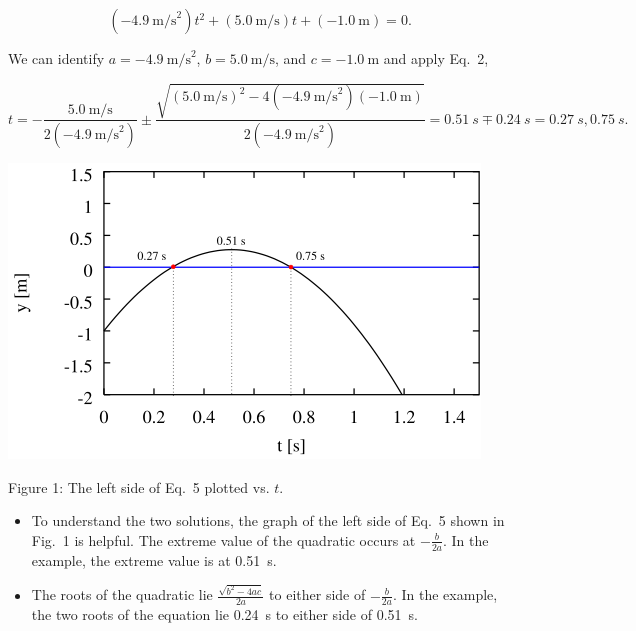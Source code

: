 \documentclass[12pt]{article}
\begin{document}
\begin{itemize}
  \begin{equation}
    \label{eq:example}
    (-4.9~\mathrm{m/s}^2) t^2 + (5.0~\mathrm{m/s}) t + (-1.0~\mathrm{m}) = 0.
  \end{equation}

  \noindent
  We can identify $a =-4.9~\mathrm{m/s}^2$, $b = 5.0~\mathrm{m/s}$, and
  $c = -1.0~\mathrm{m}$ and apply Eq.~2,%

  \begin{equation}
    t = -\frac{5.0~\mathrm{m/s}}{2(-4.9~\mathrm{m/s}^2)} 
    \pm \frac{\sqrt{(5.0~\mathrm{m/s})^2 - 
        4(-4.9~\mathrm{m/s}^2)(-1.0~\mathrm{m})}}
        {2(-4.9~\mathrm{m/s}^2)}
        = 0.51~s \mp 0.24~s = 0.27~s, 0.75~s.
  \end{equation}

    \begin{center}
      \includegraphics{proj.png}

      Figure 1: The left side of Eq.~5 %
      plotted vs. $t$.
    \end{center}

  \begin{itemize}
  \item To understand the two solutions, the graph of the left side of
    Eq.~5 %
    shown in Fig.~1 %
    is helpful. The extreme value of the quadratic occurs at
    $-\frac{b}{2a}$. In the example, the extreme value is at 0.51~s. 

  \item The roots of the quadratic lie $\frac{\sqrt{b^2 - 4ac}}{2a}$ to
    either side of $-\frac{b}{2a}$.  In the example, the two roots of
    the equation lie 0.24~s to either side of 0.51~s.


\end{itemize}
\end{itemize}
\end{document}
